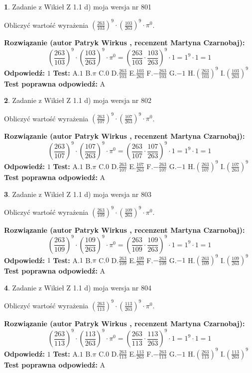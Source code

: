 \documentclass[12pt, a4paper]{article}
\theoremstyle{definition} %
\newtheorem{zad}{}
\newcommand{\zadStart}[1]{\begin{zad}#1\newline}
\newcommand{\zadStop}{\end{zad}}
\newcommand{\rozwStart}[2]{\noindent \textbf{Rozwiązanie (autor #1 , recenzent #2): }\newline}
\newcommand{\rozwStop}{\newline}
\newcommand{\odpStart}{\noindent \textbf{Odpowiedź:}\newline}
\newcommand{\odpStop}{\newline}
\newcommand{\testStart}{\noindent \textbf{Test:}\newline}
\newcommand{\testStop}{\newline}
\newcommand{\kluczStart}{\noindent \textbf{Test poprawna odpowiedź:}\newline}
\newcommand{\kluczStop}{\newline}
\begin{document}
\zadStart{Zadanie z Wikieł Z 1.1 d) moja wersja nr 801}

Obliczyć wartość wyrażenia $(\frac{263}{103})^{9} \cdot (\frac{103}{263})^{9} \cdot \pi^{0}$.
\zadStop
\rozwStart{Patryk Wirkus}{Martyna Czarnobaj}
$$(\frac{263}{103})^{9} \cdot (\frac{103}{263})^{9} \cdot \pi^{0} = (\frac{263}{103} \cdot \frac{103}{263})^{9} \cdot 1 = 1^{9} \cdot 1 = 1$$
\rozwStop
\odpStart
$1$
\odpStop
\testStart
A.$1$ B.$\pi$ C.$0$ D.$\frac{263}{103}$ E.$\frac{103}{263}$
F.$-\frac{263}{103}$ G.$-1$
H.$(\frac{263}{103})^{9}$
I.$(\frac{103}{263})^{9}$
\testStop
\kluczStart
A
\kluczStop



\zadStart{Zadanie z Wikieł Z 1.1 d) moja wersja nr 802}

Obliczyć wartość wyrażenia $(\frac{263}{107})^{9} \cdot (\frac{107}{263})^{9} \cdot \pi^{0}$.
\zadStop
\rozwStart{Patryk Wirkus}{Martyna Czarnobaj}
$$(\frac{263}{107})^{9} \cdot (\frac{107}{263})^{9} \cdot \pi^{0} = (\frac{263}{107} \cdot \frac{107}{263})^{9} \cdot 1 = 1^{9} \cdot 1 = 1$$
\rozwStop
\odpStart
$1$
\odpStop
\testStart
A.$1$ B.$\pi$ C.$0$ D.$\frac{263}{107}$ E.$\frac{107}{263}$
F.$-\frac{263}{107}$ G.$-1$
H.$(\frac{263}{107})^{9}$
I.$(\frac{107}{263})^{9}$
\testStop
\kluczStart
A
\kluczStop



\zadStart{Zadanie z Wikieł Z 1.1 d) moja wersja nr 803}

Obliczyć wartość wyrażenia $(\frac{263}{109})^{9} \cdot (\frac{109}{263})^{9} \cdot \pi^{0}$.
\zadStop
\rozwStart{Patryk Wirkus}{Martyna Czarnobaj}
$$(\frac{263}{109})^{9} \cdot (\frac{109}{263})^{9} \cdot \pi^{0} = (\frac{263}{109} \cdot \frac{109}{263})^{9} \cdot 1 = 1^{9} \cdot 1 = 1$$
\rozwStop
\odpStart
$1$
\odpStop
\testStart
A.$1$ B.$\pi$ C.$0$ D.$\frac{263}{109}$ E.$\frac{109}{263}$
F.$-\frac{263}{109}$ G.$-1$
H.$(\frac{263}{109})^{9}$
I.$(\frac{109}{263})^{9}$
\testStop
\kluczStart
A
\kluczStop



\zadStart{Zadanie z Wikieł Z 1.1 d) moja wersja nr 804}

Obliczyć wartość wyrażenia $(\frac{263}{113})^{9} \cdot (\frac{113}{263})^{9} \cdot \pi^{0}$.
\zadStop
\rozwStart{Patryk Wirkus}{Martyna Czarnobaj}
$$(\frac{263}{113})^{9} \cdot (\frac{113}{263})^{9} \cdot \pi^{0} = (\frac{263}{113} \cdot \frac{113}{263})^{9} \cdot 1 = 1^{9} \cdot 1 = 1$$
\rozwStop
\odpStart
$1$
\odpStop
\testStart
A.$1$ B.$\pi$ C.$0$ D.$\frac{263}{113}$ E.$\frac{113}{263}$
F.$-\frac{263}{113}$ G.$-1$
H.$(\frac{263}{113})^{9}$
I.$(\frac{113}{263})^{9}$
\testStop
\kluczStart
A
\kluczStop
\end{document}
